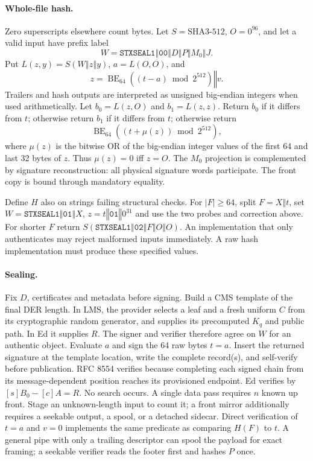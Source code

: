 \documentclass[10pt,twocolumn,letterpaper]{article}
\newcommand{\cat}{\mathbin\Vert}
\newcommand{\be}{\operatorname{BE}}
\begin{document}
\paragraph{Whole-file hash.}
Zero superscripts elsewhere count bytes. Let $S=\mathrm{SHA3\text{-}512}$, $O=0^{96}$, and let a valid input have prefix label
\[
 W=\texttt{STXSEAL1}\cat\mathtt{00}\cat D\cat P\cat M_0\cat J .
\]
Put $L(z,y)=S(W\cat z\cat y)$, $a=L(O,O)$, and
\[
 z=\be_{64}((t-a)\bmod 2^{512})\cat v .
\]
Trailers and hash outputs are interpreted as unsigned big-endian integers when used arithmetically. Let $b_0=L(z,O)$ and $b_1=L(z,z)$. Return $b_0$ if it differs from $t$; otherwise return $b_1$ if it differs from $t$; otherwise return
\[
 \be_{64}((t+\mu(z))\bmod 2^{512}),
\]
where $\mu(z)$ is the bitwise OR of the big-endian integer values of the first 64 and last 32 bytes of $z$. Thus $\mu(z)=0$ iff $z=O$. The $M_0$ projection is complemented by signature reconstruction: all physical signature words participate. The front copy is bound through mandatory equality.

Define $H$ also on strings failing structural checks. For $|F|\ge64$, split $F=X\cat t$, set $W=\texttt{STXSEAL1}\cat\mathtt{01}\cat X$, $z=t\cat\mathtt{01}\cat0^{31}$ and use the two probes and correction above. For shorter $F$ return $S(\texttt{STXSEAL1}\cat\mathtt{02}\cat F\cat O\cat O)$. An implementation that only authenticates may reject malformed inputs immediately. A raw hash implementation must produce these specified values.

\paragraph{Sealing.}
Fix $D$, certificates and metadata before signing. Build a CMS template of the final DER length. In LMS, the provider selects a leaf and a fresh uniform $C$ from its cryptographic random generator, and supplies its precomputed $K_q$ and public path. In Ed it supplies $R$. The signer and verifier therefore agree on $W$ for an authentic object. Evaluate $a$ and sign the 64 raw bytes $t=a$. Insert the returned signature at the template location, write the complete record(s), and self-verify before publication. RFC 8554 verifies because completing each signed chain from its message-dependent position reaches its provisioned endpoint. Ed verifies by $[s]B_0-[c]A=R$. No search occurs. A single data pass requires $n$ known up front. Stage an unknown-length input to count it; a front mirror additionally requires a seekable output, a spool, or a detached sidecar. Direct verification of $t=a$ and $v=0$ implements the same predicate as comparing $H(F)$ to $t$. A general pipe with only a trailing descriptor can spool the payload for exact framing; a seekable verifier reads the footer first and hashes $P$ once.
\end{document}
